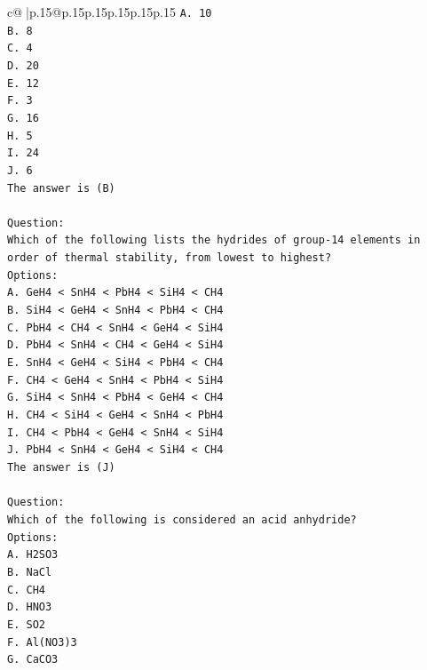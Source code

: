 \documentclass{article}
\begin{document}
{\begin{supertabular}{c@{$\;$}|p{.15\linewidth}@{}p{.15\linewidth}p{.15\linewidth}p{.15\linewidth}p{.15\linewidth}p{.15\linewidth}}
{{{\texttt{A. 10} \\
\texttt{B. 8} \\
\texttt{C. 4} \\
\texttt{D. 20} \\
\texttt{E. 12} \\
\texttt{F. 3} \\
\texttt{G. 16} \\
\texttt{H. 5} \\
\texttt{I. 24} \\
\texttt{J. 6} \\
\texttt{The answer is (B)} \\
\\ 
\texttt{Question:} \\
\texttt{Which of the following lists the hydrides of group{-}14 elements in order of thermal stability, from lowest to highest?} \\
\texttt{Options:} \\
\texttt{A. GeH4 < SnH4 < PbH4 < SiH4 < CH4} \\
\texttt{B. SiH4 < GeH4 < SnH4 < PbH4 < CH4} \\
\texttt{C. PbH4 < CH4 < SnH4 < GeH4 < SiH4} \\
\texttt{D. PbH4 < SnH4 < CH4 < GeH4 < SiH4} \\
\texttt{E. SnH4 < GeH4 < SiH4 < PbH4 < CH4} \\
\texttt{F. CH4 < GeH4 < SnH4 < PbH4 < SiH4} \\
\texttt{G. SiH4 < SnH4 < PbH4 < GeH4 < CH4} \\
\texttt{H. CH4 < SiH4 < GeH4 < SnH4 < PbH4} \\
\texttt{I. CH4 < PbH4 < GeH4 < SnH4 < SiH4} \\
\texttt{J. PbH4 < SnH4 < GeH4 < SiH4 < CH4} \\
\texttt{The answer is (J)} \\
\\ 
\texttt{Question:} \\
\texttt{Which of the following is considered an acid anhydride?} \\
\texttt{Options:} \\
\texttt{A. H2SO3} \\
\texttt{B. NaCl} \\
\texttt{C. CH4} \\
\texttt{D. HNO3} \\
\texttt{E. SO2} \\
\texttt{F. Al(NO3)3} \\
\texttt{G. CaCO3} \\
}}}
\end{supertabular}}
\end{document}
